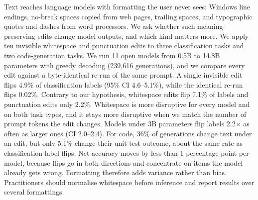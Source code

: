 Text reaches language models with formatting the user never sees: Windows line endings, no-break spaces copied from web pages, trailing spaces, and typographic quotes and dashes from word processors.
We ask whether such meaning-preserving edits change model outputs, and which kind matters more.
We apply ten invisible whitespace and punctuation edits to three classification tasks and two code-generation tasks.
We run 11 open models from 0.5B to 14.8B parameters with greedy decoding (239,616 generations), and we compare every edit against a byte-identical re-run of the same prompt.
A single invisible edit flips 4.9\% of classification labels (95\% CI 4.6--5.1\%), while the identical re-run flips 0.02\%.
Contrary to our hypothesis, whitespace edits flip 7.1\% of labels and punctuation edits only 2.2\%. Whitespace is more disruptive for every model and on both task types, and it stays more disruptive when we match the number of prompt tokens the edit changes.
Models under 3B parameters flip labels 2.2$\times$ as often as larger ones (CI 2.0--2.4).
For code, 36\% of generations change text under an edit, but only 5.1\% change their unit-test outcome, about the same rate as classification label flips.
Net accuracy moves by less than 1 percentage point per model, because flips go in both directions and concentrate on items the model already gets wrong.
Formatting therefore adds variance rather than bias. Practitioners should normalise whitespace before inference and report results over several formattings.
